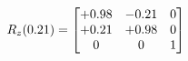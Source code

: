 \documentclass[preview]{standalone}
\begin{document}
\begin{align*}
\special{dvisvgm:raw <g id='unique000'>}R_{z}(0.21) = \begin{bmatrix}+0.98 & -0.21 & 0 \\+0.21 & +0.98 & 0 \\0 & 0 & 1\end{bmatrix}\special{dvisvgm:raw </g>}
\end{align*}
\end{document}
